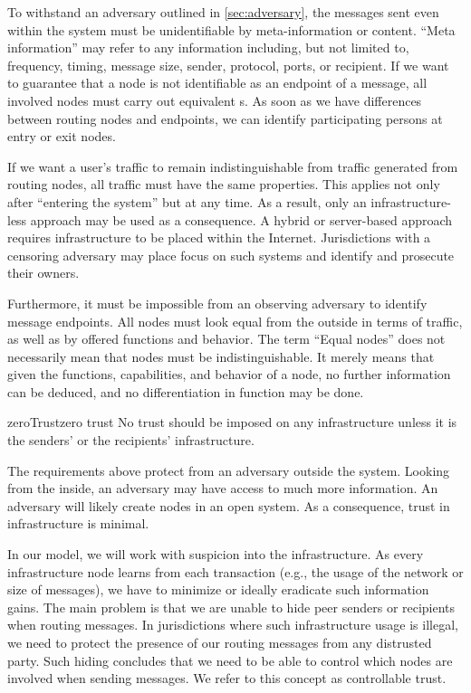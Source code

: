 To withstand an adversary outlined in \cref{sec:adversary}, the messages sent even within the system must be unidentifiable by meta-information or content. ``Meta information'' may refer to any information including, but not limited to, frequency, timing, message size, sender, protocol, ports, or recipient. If we want to guarantee that a node is not identifiable as an endpoint of a message, all involved nodes must carry out equivalent s. As soon as we have differences between routing nodes and endpoints, we can identify participating persons at entry or exit nodes.

If we want a user's traffic to remain indistinguishable from traffic generated from routing nodes, all traffic must have the same properties. This applies not only after ``entering the system'' but at any time. As a result, only an infrastructure-less approach may be used as a consequence. A hybrid or server-based approach requires infrastructure to be placed within the Internet. Jurisdictions with a censoring adversary may place focus on such systems and identify and prosecute their owners. 

Furthermore, it must be impossible from an observing adversary to identify message endpoints. All nodes must look equal from the outside in terms of traffic, as well as by offered functions and behavior. The term ``Equal nodes'' does not necessarily mean that nodes must be indistinguishable. It merely means that given the functions, capabilities, and behavior of a node, no further information can be deduced, and no differentiation in function may be done.

\begin{requirement}{zeroTrust}{zero trust}
	No trust should be imposed on any infrastructure unless it is the senders' or the recipients' infrastructure.
\end{requirement}    

The requirements above protect from an adversary outside the system. Looking from the inside, an adversary may have access to much more information. An adversary will likely create nodes in an open system. As a consequence, trust in infrastructure is minimal.

In our model, we will work with suspicion into the infrastructure.
 As every infrastructure node learns from each transaction (e.g., the usage of the network or size of messages), we have to minimize or ideally eradicate such information gains. The main problem is that we are unable to hide peer senders or recipients when routing messages. In jurisdictions where such infrastructure usage is illegal, we need to protect the presence of our routing messages from any distrusted party. Such hiding concludes that we need to be able to control which nodes are involved when sending messages. We refer to this concept as controllable trust.

